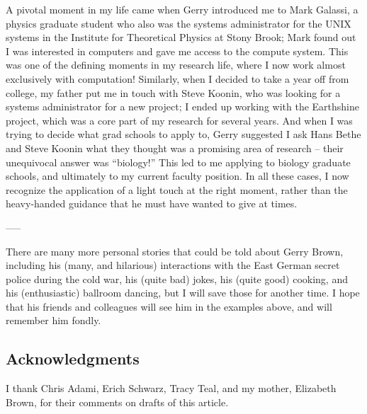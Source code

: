 A pivotal moment in my life came when Gerry introduced me to Mark
Galassi, a physics graduate student who also was the systems
administrator for the UNIX systems in the Institute for Theoretical
Physics at Stony Brook; Mark found out I was interested in computers
and gave me access to the compute system. This was one of the defining
moments in my research life, where I now work almost exclusively with
computation! Similarly, when I decided to take a year off from
college, my father put me in touch with Steve Koonin, who was looking
for a systems administrator for a new project; I ended up working with
the Earthshine project, which was a core part of my research for
several years. And when I was trying to decide what grad schools to
apply to, Gerry suggested I ask Hans Bethe and Steve Koonin what they
thought was a promising area of research -- their unequivocal answer
was ``biology!''  This led to me applying to biology graduate schools, and
ultimately to my current faculty position. In all these cases, I now
recognize the application of a light touch at the right moment, rather
than the heavy-handed guidance that he must have wanted to give at
times.

-----

There are many more personal stories that could be told about Gerry
Brown, including his (many, and hilarious) interactions with the East
German secret police during the cold war, his (quite bad) jokes, his
(quite good) cooking, and his (enthusiastic) ballroom dancing, but I
will save those for another time. I hope that his friends and
colleagues will see him in the examples above, and will remember him
fondly.


\subsection*{Acknowledgments}

I thank Chris Adami, Erich Schwarz, Tracy Teal, and my mother,
Elizabeth Brown, for their comments on drafts of this article.


